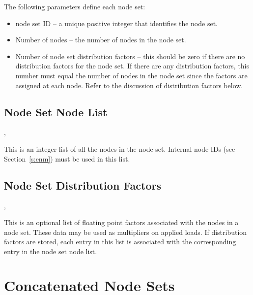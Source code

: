 {The following parameters define each node set:}

\begin{itemize}
 \item {node set ID -- a unique positive integer that identifies the
 node set.}

 \item {Number of nodes -- the number of nodes in the node
set.}

 \item {Number of node set distribution factors -- this should be zero
 if there are no distribution factors for the node set. If there are
 any distribution factors, this number must equal the number of nodes
 in the node set since the factors are assigned at each node. Refer to
 the discussion of distribution factors below.}
\end{itemize}



\subsection{Node Set Node List}

\begin{spacing}{1.5}
\api {}, 
\end{spacing}

{This is an integer list of all the nodes in the node set. Internal
node IDs (see Section~\ref{s:enm}) must be used in this list.}



\subsection{Node Set Distribution Factors}

\begin{spacing}{1.5}
\api {}, 
\end{spacing}

{This is an optional list of floating point factors associated with
the nodes in a node set. These data may be used as multipliers on
applied loads. If distribution factors are stored, each entry in this
list is associated with the corresponding entry in the node set node
list.}


\section{Concatenated Node Sets}

